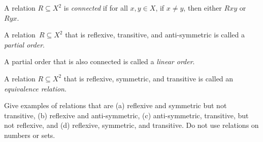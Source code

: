 \documentclass[../../../include/open-logic-section]{subfiles}
\begin{document}
\begin{defn}[Connectivity]
A relation $R \subseteq X^2$ is \emph{connected} if for all $x,y\in
X$, if $x \neq y$, then either $Rxy$ or~$Ryx$.
\end{defn}

\begin{defn}
A relation~$R \subseteq X^2$ that is reflexive, transitive, and
anti-symmetric is called a \emph{partial order}. 
\end{defn}

\begin{defn}
A partial order that is also connected is called a \emph{linear order}.
\end{defn}

\begin{defn}
A relation $R \subseteq X^2$ that is reflexive, symmetric, and
transitive is called an \emph{equivalence relation}.
\end{defn}

\begin{prob}
Give examples of relations that are (a) reflexive and symmetric but
not transitive, (b) reflexive and anti-symmetric, (c) anti-symmetric,
transitive, but not reflexive, and (d) reflexive, symmetric, and
transitive.  Do not use relations on numbers or sets.
\end{prob}
\end{document}
